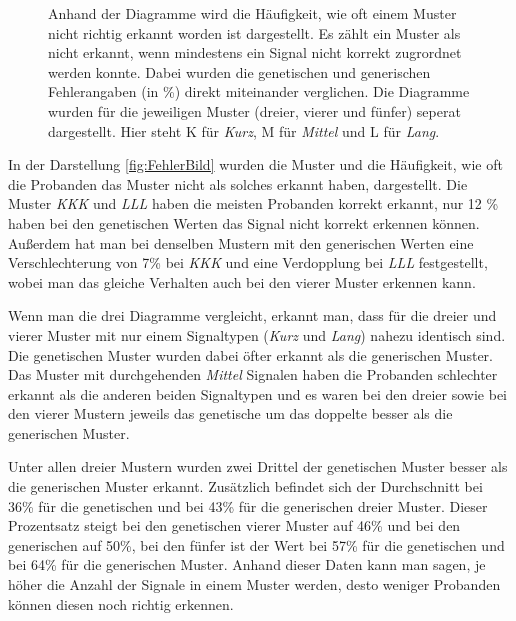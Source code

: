 \begin{figure}[htbp]
\begin{minipage}[t]{0.8\textwidth}
	\end{minipage}
	\caption{Anhand der Diagramme wird die H{\"a}ufigkeit, wie oft einem Muster nicht richtig erkannt worden ist dargestellt. Es z{\"a}hlt ein Muster als nicht erkannt, wenn mindestens ein Signal nicht korrekt zugrordnet werden konnte.   
	Dabei wurden die genetischen und generischen Fehlerangaben (in \%) direkt miteinander verglichen. 
	Die Diagramme wurden f{\"u}r die jeweiligen Muster (dreier, vierer und f{\"u}nfer) seperat dargestellt.
	Hier steht K f{\"u}r \textit{Kurz}, M f{\"u}r \textit{Mittel} und L f{\"u}r \textit{Lang}.}
	\label{fig:FehlerBild}
\end{figure}
 
In der Darstellung \autoref{fig:FehlerBild} wurden die Muster und die H{\"a}ufigkeit, wie oft die Probanden das Muster nicht als solches erkannt haben, dargestellt. 
Die Muster \textit{KKK} und \textit{LLL} haben die meisten Probanden korrekt erkannt, nur 12 \% haben bei den genetischen Werten das Signal nicht korrekt erkennen k{\"o}nnen. 
Au{\ss}erdem hat man bei denselben Mustern mit den generischen Werten eine Verschlechterung von 7\% bei \textit{KKK} und eine Verdopplung bei \textit{LLL} festgestellt, wobei man das gleiche Verhalten auch bei den vierer Muster erkennen kann.

Wenn man die drei Diagramme vergleicht, erkannt man, dass f{\"u}r die dreier und vierer Muster mit nur einem Signaltypen (\textit{Kurz} und \textit{Lang}) nahezu identisch sind.
Die genetischen Muster wurden dabei {\"o}fter erkannt als die generischen Muster. 
Das Muster mit durchgehenden \textit{Mittel} Signalen haben die Probanden schlechter erkannt als die anderen beiden Signaltypen und es waren bei den dreier sowie bei den vierer Mustern jeweils das genetische um das doppelte besser als die generischen Muster.

Unter allen dreier Mustern wurden zwei Drittel der genetischen Muster besser als die generischen Muster erkannt. 
Zus{\"a}tzlich befindet sich der Durchschnitt bei 36\% f{\"u}r die genetischen und bei 43\% f{\"u}r die generischen dreier Muster.
Dieser Prozentsatz steigt bei den genetischen vierer Muster auf 46\% und bei den generischen auf 50\%, bei den f{\"u}nfer ist der Wert bei 57\% f{\"u}r die genetischen und bei 64\% f{\"u}r die generischen Muster. 
Anhand dieser Daten kann man sagen, je h{\"o}her die Anzahl der Signale in einem Muster werden, desto weniger Probanden k{\"o}nnen diesen noch richtig erkennen.

